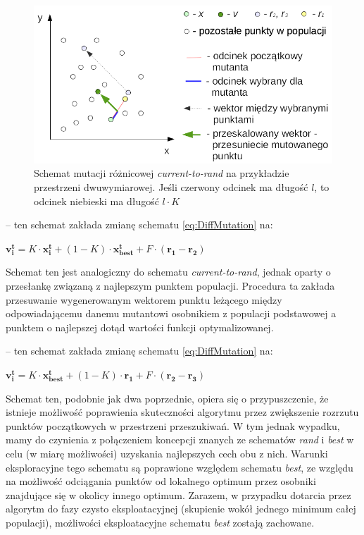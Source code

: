 \documentclass[12pt,a4paper]{report}
\begin{document}
{{{{\begin{description}
\begin{figure}[h]
\begin{center}\includegraphics[scale=0.8]{img/current-to-rand-mutation.png}\end{center}
\caption{Schemat mutacji różnicowej \emph{current-to-rand} na przykładzie przestrzeni dwuwymiarowej. Jeśli czerwony odcinek ma długość $l$, to odcinek niebieski ma długość $l \cdot K$}
\label{current-to-rand-img}
\end{figure}


\item[current-to-best] \cite{PracticalInsights} -- ten schemat zakłada zmianę schematu \ref{eq:DiffMutation} na:
\begin{center}
 $\mathbf{v_i^{t}} = K \cdot \mathbf{x_i^t} + (1 - K) \cdot \mathbf{x_{best}^t} + F \cdot (\mathbf{r_{1}} - \mathbf{r_{2}})$
\end{center}
Schemat ten jest analogiczny do schematu \emph{current-to-rand}, jednak oparty o przesłankę związaną z najlepszym punktem populacji. Procedura ta zakłada przesuwanie wygenerowanym wektorem punktu leżącego między odpowiadającemu danemu mutantowi osobnikiem z populacji podstawowej a punktem o najlepszej dotąd wartości funkcji optymalizowanej.


\item[rand-to-best] \cite{PracticalInsights} -- ten schemat zakłada zmianę schematu \ref{eq:DiffMutation} na:
\begin{center}
 $\mathbf{v_i^{t}} = K \cdot \mathbf{x_{best}^t} + (1 - K) \cdot \mathbf{r_1} + F \cdot (\mathbf{r_{2}} - \mathbf{r_{3}})$
\end{center}
Schemat ten, podobnie jak dwa poprzednie, opiera się o przypuszczenie, że istnieje możliwość poprawienia skuteczności algorytmu przez zwiększenie rozrzutu punktów początkowych w przestrzeni przeszukiwań. W tym jednak wypadku, mamy do czynienia z połączeniem koncepcji znanych ze schematów \emph{rand} i \emph{best} w celu (w miarę możliwości) uzyskania najlepszych cech obu z nich. Warunki eksploracyjne tego schematu są poprawione względem schematu \emph{best}, ze względu na możliwość odciągania punktów od lokalnego optimum przez osobniki znajdujące się w okolicy innego optimum. Zarazem, w przypadku dotarcia przez algorytm do fazy czysto eksploatacyjnej (skupienie wokół jednego minimum całej populacji), możliwości eksploatacyjne schematu \emph{best} zostają zachowane.


\end{description}}}}}
\end{document}
